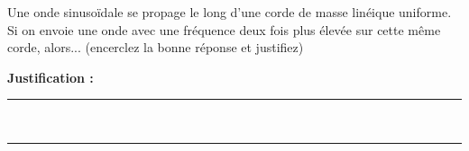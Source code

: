 Une onde sinusoïdale se propage le long d'une corde de masse linéique uniforme. Si on envoie une onde avec une fréquence deux fois plus élevée sur cette même corde, alors... (encerclez la bonne réponse et justifiez)

\choices

\noindent\textbf{Justification :} \hrulefill \\[2.5ex]
\rule{\linewidth}{0.4pt} \\[2.5ex]
\rule{\linewidth}{0.4pt}
\vfill